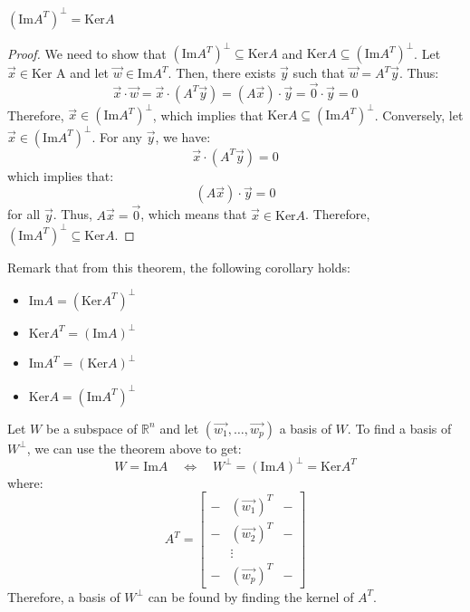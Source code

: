 \begin{theorem}
    $(\text{Im} A^T)^{\perp} = \text{Ker} A$
\end{theorem}
\begin{proof}
    We need to show that $(\text{Im} A^T)^{\perp} \subseteq \text{Ker} A$ and $\text{Ker} A \subseteq (\text{Im} A^T)^{\perp}$.
    Let $\vec{x} \in \text{Ker A}$ and let $\vec{w} \in \text{Im} A^T$. Then, there exists $\vec{y}$ such that $\vec{w} = A^T \vec{y}$. Thus:
    \[
        \vec{x} \cdot \vec{w} = \vec{x} \cdot (A^T \vec{y}) = (A \vec{x}) \cdot \vec{y} = \vec{0} \cdot \vec{y} = 0
    \]
    Therefore, $\vec{x} \in (\text{Im} A^T)^{\perp}$, which implies that $\text{Ker} A \subseteq (\text{Im} A^T)^{\perp}$.
    Conversely, let $\vec{x} \in (\text{Im} A^T)^{\perp}$. For any $\vec{y}$, we have:
    \[
        \vec{x} \cdot (A^T \vec{y}) = 0
    \]
    which implies that:
    \[
        (A \vec{x}) \cdot \vec{y} = 0
    \]
    for all $\vec{y}$. Thus, $A \vec{x} = \vec{0}$, which means that $\vec{x} \in \text{Ker} A$. Therefore, $(\text{Im} A^T)^{\perp} \subseteq \text{Ker} A$.
\end{proof}
Remark that from this theorem, the following corollary holds:
\begin{itemize}[itemsep=1pt,label=$\circ$]
    \item $\text{Im} A = (\text{Ker} A^T)^{\perp}$
    \item $\text{Ker} A^T = (\text{Im} A)^{\perp}$
    \item $\text{Im} A^T = (\text{Ker} A)^{\perp}$
    \item $\text{Ker} A = (\text{Im} A^T)^{\perp}$
\end{itemize}

\begin{eg}
    Let $W$ be a subspace of $\mathbb{R}^n$ and let $(\vec{w_1}, \ldots, \vec{w_p})$ a basis of $W$. To find a basis of $W^{\perp}$, we can use the theorem above to get:
    \[
        W = \text{Im} A \quad \iff \quad W^{\perp} = \left(\text{Im} A\right)^{\perp} = \text{Ker} A^T
    \]
    where:
    \[
        A^T = \begin{bmatrix}
            - & (\vec{w_1})^T & - \\
            - & (\vec{w_2})^T & - \\
            & \vdots & \\
            - & (\vec{w_p})^T & -   
        \end{bmatrix}
    \]
    Therefore, a basis of $W^{\perp}$ can be found by finding the kernel of $A^T$.
\end{eg}

